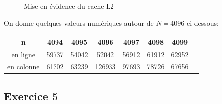\documentclass[11pt, a4 paper]{article}
\begin{document}
\begin{figure}[!h]
    \caption{Mise en évidence du cache L2}
\end{figure}

On donne quelques valeurs numériques autour de $N = 4096$ ci-dessous:
\begin{center}
    \begin{tabular}{| c | c | c | c | c | c | c | c |}
        \hline
    n & 4094 & 4095 & 4096 & 4097 & 4098 & 4099 \\
    \hline
    en ligne & 59737 & 54042 & 52042 & 56912 & 61912 & 62952 \\
    \hline
    en colonne & 61302 & 63239 & 126933 & 97693 & 78726 & 67656 \\
    \hline
    \end{tabular}
\end{center}

\subsection{Exercice 5}





\end{document}
